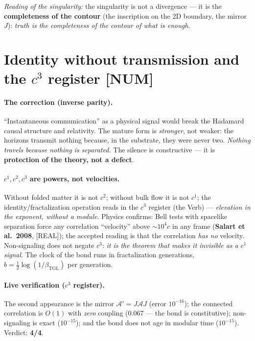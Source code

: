 \documentclass[11pt]{article}
\newcommand{\bTGL}{\beta_{\mathrm{TGL}}}\newcommand{\Msun}{M_{\odot}}\newcommand{\TGL}{\mathrm{TGL}}
\theoremstyle{definition}\newtheorem{deriv}{Derivation}
\begin{document}
\emph{Reading of the singularity:} the singularity is not a divergence --- it is the \textbf{completeness of the contour} (the inscription on the 2D boundary, the mirror $J$): \emph{truth is the completeness of the contour of what is enough.}

\section{Identity without transmission and the $c^3$ register \textsf{[NUM]}}

\paragraph{The correction (inverse parity).} ``Instantaneous communication'' as a physical signal would break the Hadamard causal structure and relativity. The mature form is \emph{stronger}, not weaker: the horizons transmit nothing because, in the substrate, they were never two. \emph{Nothing travels because nothing is separated.} The silence is constructive --- it is \textbf{protection of the theory, not a defect}.

\paragraph{$c^1,c^2,c^3$ are powers, not velocities.} Without folded matter it is not $c^2$; without bulk flow it is not $c^1$; the identity/fractalization operation reads in the $c^3$ register (the Verb) --- \emph{elevation in the exponent, without a module}. Physics confirms: Bell tests with spacelike separation force any correlation ``velocity'' above $\sim10^4c$ in any frame (\textbf{Salart et al.\ 2008}, \textsf{[REAL]}); the accepted reading is that the correlation \emph{has no} velocity. Non-signaling does not negate $c^3$: \emph{it is the theorem that makes it invisible as a $c^1$ signal}. The clock of the bond runs in fractalization generations, $b=\tfrac12\log(1/\bTGL)$ per generation.

\paragraph{Live verification ($c^3$ register).} The second appearance is the mirror $\mathcal{A}'=J\mathcal{A}J$ (error $10^{-16}$); the connected correlation is $O(1)$ with \emph{zero} coupling ($0.067$ --- the bond is constitutive); non-signaling is exact ($10^{-15}$); and the bond does not age in modular time ($10^{-15}$). Verdict: \textbf{4/4}.
\end{document}
